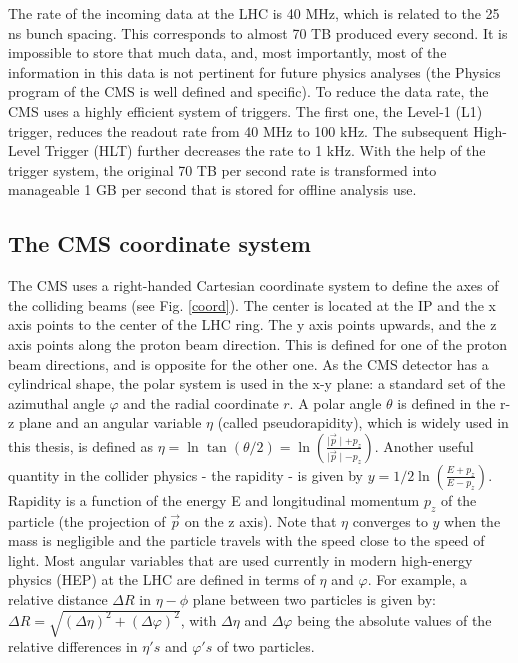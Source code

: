 \begin{normalsize}
The rate of the incoming data at the LHC is 40 MHz, which is related to the 25 ns bunch spacing. This corresponds to almost 70 TB produced every second. It is impossible to store that much data, and, most importantly, most of the information in this data is not pertinent for future physics analyses (the Physics program of the CMS is well defined and specific). To reduce the data rate, the CMS uses a highly efficient system of triggers. The first one, the Level-1 (L1) trigger, reduces the readout rate from 40 MHz to 100 kHz. The subsequent High-Level Trigger (HLT) further decreases the rate to 1 kHz. With the help of the trigger system, the original 70 TB per second rate is transformed into manageable 1 GB per second that is stored for offline analysis use. 




\subsection{The CMS coordinate system}

The CMS uses a right-handed Cartesian coordinate system to define the axes of the colliding beams (see Fig. \ref{coord}). The center is located at the IP and the x axis points to the center of the LHC ring. The y axis points upwards, and the z axis points along the proton beam direction. This is defined for one of the proton beam directions, and is opposite for the other one. As the CMS detector has a cylindrical shape, the polar system is used in the x-y plane: a standard set of the azimuthal angle $\varphi$ and the radial coordinate $r$. A polar angle $\theta$ is defined in the r-z plane and an angular variable $\eta$ (called pseudorapidity), which is widely used in this thesis, is defined as $\eta = \ln \tan(\theta/2) = \ln (\frac{\mid \vec{p}\mid + p_z}{\mid \vec{p}\mid - p_z})$. Another useful quantity in the collider physics - the rapidity - is given by $y = 1/2 \ln ( \frac{E + p_z}{E - p_z})$. Rapidity is a function of the energy E and longitudinal momentum $p_z$ of the particle (the projection of $\vec{p}$ on the z axis). 
Note that $\eta$ converges to $y$ when the mass is negligible and the particle travels with the speed close to the speed of light. Most angular variables that are used currently in modern high-energy physics (HEP) at the LHC are defined in terms of $\eta$ and $\varphi$. For example, a relative distance $\Delta R$ in $\eta - \phi$ plane between two particles is given by:
$ \Delta R = \sqrt{(\Delta \eta)^2 + (\Delta \varphi)^2}$, with $\Delta \eta$ and $\Delta \varphi$ being the absolute values of the relative differences in $\eta's$ and $\varphi 's$ of two particles. 


\end{normalsize}
